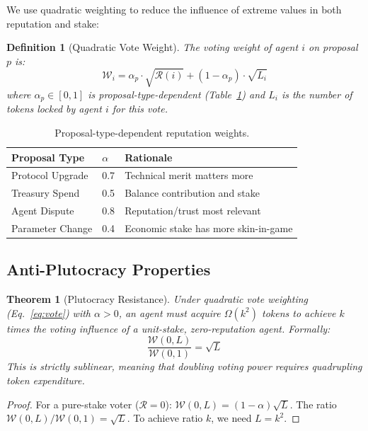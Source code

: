 \documentclass[conference]{IEEEtran}
\newtheorem{theorem}{Theorem}
\newtheorem{definition}{Definition}
\begin{document}
We use quadratic weighting to reduce the influence of extreme values in both reputation and stake:

\begin{definition}[Quadratic Vote Weight]
The voting weight of agent $i$ on proposal $p$ is:
\begin{equation}\label{eq:vote}
    \mathcal{W}_i = \alpha_p \cdot \sqrt{\mathcal{R}(i)} + (1 - \alpha_p) \cdot \sqrt{L_i}
\end{equation}
where $\alpha_p \in [0, 1]$ is proposal-type-dependent (Table~\ref{tab:alpha}) and $L_i$ is the number of tokens locked by agent $i$ for this vote.
\end{definition}

\begin{table}[t]
\centering
\begin{tabular}{lll}
\toprule
\textbf{Proposal Type} & \textbf{$\alpha$} & \textbf{Rationale} \\
\midrule
Protocol Upgrade & 0.7 & Technical merit matters more \\
Treasury Spend & 0.5 & Balance contribution and stake \\
Agent Dispute & 0.8 & Reputation/trust most relevant \\
Parameter Change & 0.4 & Economic stake has more skin-in-game \\
\bottomrule
\end{tabular}
\caption{Proposal-type-dependent reputation weights.}
\label{tab:alpha}
\end{table}

\subsection{Anti-Plutocracy Properties}

\begin{theorem}[Plutocracy Resistance]\label{thm:plutocracy}
Under quadratic vote weighting (Eq.~\ref{eq:vote}) with $\alpha > 0$, an agent must acquire $\Omega(k^2)$ tokens to achieve $k$ times the voting influence of a unit-stake, zero-reputation agent. Formally:
\begin{equation}
    \frac{\mathcal{W}(0, L)}{\mathcal{W}(0, 1)} = \sqrt{L}
\end{equation}
This is strictly sublinear, meaning that doubling voting power requires quadrupling token expenditure.
\end{theorem}

\begin{proof}
For a pure-stake voter ($\mathcal{R} = 0$): $\mathcal{W}(0, L) = (1-\alpha)\sqrt{L}$. The ratio $\mathcal{W}(0,L)/\mathcal{W}(0,1) = \sqrt{L}$. To achieve ratio $k$, we need $L = k^2$.
\end{proof}
\end{document}
